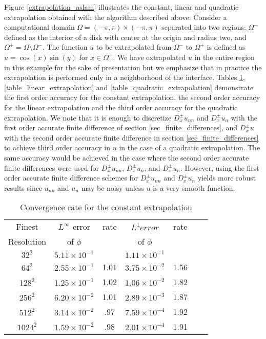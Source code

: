 \documentclass[english]{article}
\begin{document}
Figure \ref{extrapolation_aslam} illustrates the constant, linear and quadratic extrapolation
obtained with the algorithm described above: Consider a computational domain $\Omega=(-\pi,
\pi)\times(-\pi, \pi)$ separated into two regions: $\Omega^-$ defined as the interior of a disk
with center at the origin and radius two, and $\Omega^+=\Omega \setminus \Omega^-$. The function
$u$ to be extrapolated from $\Omega^-$ to $\Omega^+$ is defined as $u=\cos(x)\sin(y)$ for $x \in
\Omega^-$. We have extrapolated $u$ in the entire region in this example for the sake of
presentation but we emphasize that in practice the extrapolation is performed only in a
neighborhood of the interface. Tables \ref{table_constant_extrapolation},
\ref{table_linear_extrapolation} and \ref{table_quadratic_extrapolation} demonstrate the first
order accuracy for the constant extrapolation, the second order accuracy for the linear
extrapolation and the third order accuracy for the quadratic extrapolation. We note that it is
enough to discretize $D^{\pm}_xu_{nn}$ and $D^{\pm}_xu_{n}$ with the first order accurate finite
difference of section \ref{sec_finite_differences}, and $D^{\pm}_xu$ with the second order accurate
finite difference in section \ref{sec_finite_differences} to achieve third order accuracy in $u$ in
the case of a quadratic extrapolation. The same accuracy would be achieved in the case where the
second order accurate finite differences were used for $D^{\pm}_xu_{nn}$, $D^{\pm}_xu_{n}$, and
$D^{\pm}_xu_{n}$. However, using the first order accurate finite difference schemes for
$D^{\pm}_xu_{nn}$ and $D^{\pm}_xu_{n}$ yields more robust results since $u_{nn}$ and $u_{n}$ may be
noisy unless $u$ is a very smooth function.


\begin{table}
\begin{center}
\begin{tabular}{|c|c|c|c|c|c|c|}
\hline Finest &$L^\infty$ error&rate&$L^1 error$&rate \\ Resolution& of $\phi$      &    & of
$\phi$ & \\\hline

$32^2$&$5.11\times10^{-1}$& &$1.11\times10^{-1}$&      \\\hline
$64^2$&$2.55\times10^{-1}$&1.01&$3.75\times10^{-2}$&1.56   \\\hline
$128^2$&$1.25\times10^{-1}$&1.02&$1.06\times10^{-2}$&1.82   \\\hline
$256^2$&$6.20\times10^{-2}$&1.01&$2.89\times10^{-3}$&1.87   \\\hline
$512^2$&$3.14\times10^{-2}$&.97&$7.59\times10^{-4}$&1.92   \\\hline
$1024^2$&$1.59\times10^{-2}$&.98&$2.01\times10^{-4}$&1.91   \\\hline
\end{tabular}
\end{center}
\caption{Convergence rate for the constant
extrapolation}\label{table_constant_extrapolation}
\end{table}
\end{document}
